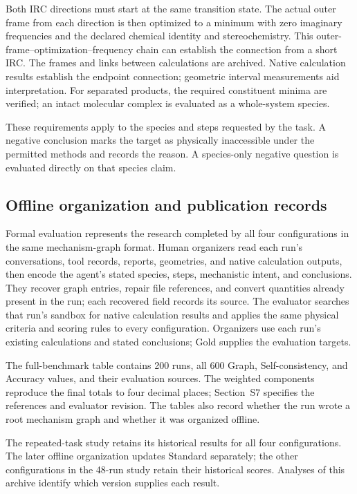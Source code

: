 Both IRC directions must start at the same transition state. The actual outer frame from each direction is then optimized to a minimum with zero imaginary frequencies and the declared chemical identity and stereochemistry. This outer-frame--optimization--frequency chain can establish the connection from a short IRC. The frames and links between calculations are archived. Native calculation results establish the endpoint connection; geometric interval measurements aid interpretation. For separated products, the required constituent minima are verified; an intact molecular complex is evaluated as a whole-system species.

These requirements apply to the species and steps requested by the task. A negative conclusion marks the target as physically inaccessible under the permitted methods and records the reason. A species-only negative question is evaluated directly on that species claim.

\subsection{Offline organization and publication records}
Formal evaluation represents the research completed by all four configurations in the same mechanism-graph format. Human organizers read each run's conversations, tool records, reports, geometries, and native calculation outputs, then encode the agent's stated species, steps, mechanistic intent, and conclusions. They recover graph entries, repair file references, and convert quantities already present in the run; each recovered field records its source. The evaluator searches that run's sandbox for native calculation results and applies the same physical criteria and scoring rules to every configuration. Organizers use each run's existing calculations and stated conclusions; Gold supplies the evaluation targets.

The full-benchmark table contains 200 runs, all 600 Graph, Self-consistency, and Accuracy values, and their evaluation sources. The weighted components reproduce the final totals to four decimal places; Section~S7 specifies the references and evaluator revision. The tables also record whether the run wrote a root mechanism graph and whether it was organized offline.

The repeated-task study retains its historical results for all four configurations. The later offline organization updates Standard separately; the other configurations in the 48-run study retain their historical scores. Analyses of this archive identify which version supplies each result.

